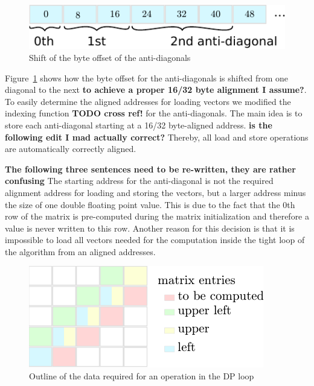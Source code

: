 \documentclass[runningheads,a4paper]{llncs}
\begin{document}
\begin{figure}[ht!]
  \centering
  \includegraphics[scale=0.9]{figures/unaligned.pdf}
  \caption{Shift of the byte offset of the anti-diagonals}
  \label{fig:unaligned}
\end{figure}

Figure~\ref{fig:unaligned} shows how the byte offset for the anti-diagonals is shifted from one diagonal to the next {\bf to achieve a proper 16/32 byte alignment I assume?}.
To easily determine the aligned addresses for loading vectors we modified the indexing function {\bf TODO cross ref!} for the anti-diagonals. 
The main idea is to store each anti-diagonal starting at a 16/32 byte-aligned address. {\bf is the following edit I mad actually correct?} Thereby, all load and store operations are automatically correctly aligned.

{\bf The following three sentences need to be re-written, they are rather confusing} The starting address for the anti-diagonal is not the required alignment address for loading and storing the vectors, but a larger address minus the size of one double floating point value. 
This is due to the fact that the 0th row of the matrix is pre-computed during the matrix initialization and therefore a value is never written to this row. Another reason for this decision is that it is impossible to load all vectors needed for the computation inside the tight loop of the algorithm from an aligned addresses.

\begin{figure}[ht!]
  \centering
  \includegraphics[scale=1.1]{figures/alignment.pdf}
  \caption{Outline of the data required for an operation in the DP loop}
  \label{fig:alignment}
\end{figure}
\end{document}
